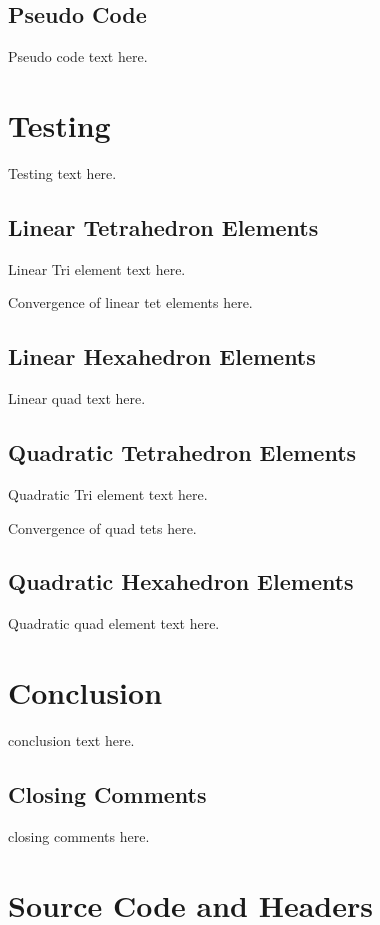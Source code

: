 \documentclass[a4paper, 12pt]{article}
\begin{document}
\subsection{Pseudo Code} \label{subsec:pseudo}
Pseudo code text here.

\section{Testing} \label{sec:testing}
Testing text here.

\subsection{Linear Tetrahedron Elements} \label{subsec:linTet}
Linear Tri element text here.

Convergence of linear tet elements here.

\subsection{Linear Hexahedron Elements} \label{subsec:linHex}
Linear quad text here.

\subsection{Quadratic Tetrahedron Elements} \label{subsec:quadTet}
Quadratic Tri element text here.

Convergence of quad tets here.

\subsection{Quadratic Hexahedron Elements} \label{subsec:quadHex}
Quadratic quad element text here.

\section{Conclusion} \label{sec:conclusion}
conclusion text here.

\subsection{Closing Comments} \label{sec:comments}
closing comments here.

\newpage
\appendix
\section{Source Code and Headers} \label{sec:code}
\end{document}
